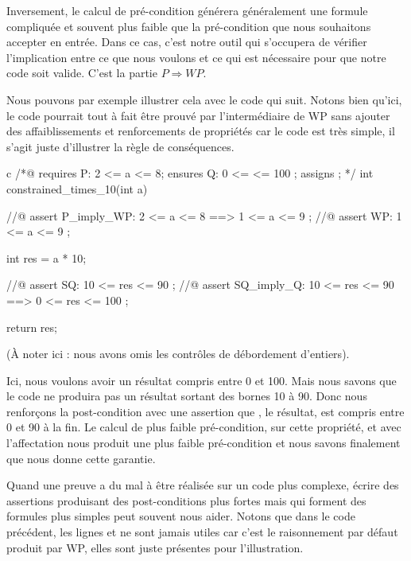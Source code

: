 Inversement, le calcul de pré-condition générera généralement une formule 
compliquée et souvent plus faible que la pré-condition que nous souhaitons
accepter en entrée. Dans ce cas, c'est notre outil qui s'occupera de vérifier 
l'implication entre ce que nous voulons et ce qui est nécessaire pour que notre
code soit valide. C'est la partie $P \Rightarrow WP$.



Nous pouvons par exemple illustrer cela avec le code qui suit. Notons bien qu'ici,
le code pourrait tout à fait être prouvé par l'intermédiaire de WP sans ajouter des
affaiblissements et renforcements de propriétés car le code est très simple, il 
s'agit juste d'illustrer la règle de conséquences.



\begin{CodeBlock}{c}
/*@
  requires P: 2 <= a <= 8;
  ensures  Q: 0 <= \result <= 100 ;
  assigns  \nothing ;
*/
int constrained_times_10(int a){
  //@ assert P_imply_WP: 2 <= a <= 8 ==> 1 <= a <= 9 ;
  //@ assert WP:         1 <= a <= 9 ;

  int res = a * 10;

  //@ assert SQ:         10 <= res <= 90 ;
  //@ assert SQ_imply_Q: 10 <= res <= 90 ==> 0 <= res <= 100 ;

  return res;
}
\end{CodeBlock}



(À noter ici : nous avons omis les contrôles de débordement d'entiers).



Ici, nous voulons avoir un résultat compris entre 0 et 100. Mais nous savons que
le code ne produira pas un résultat sortant des bornes 10 à 90. Donc nous 
renforçons la post-condition avec une assertion que , le résultat, est compris
entre 0 et 90 à la fin. Le calcul de plus faible pré-condition, sur cette propriété,
et avec l'affectation  nous produit une plus faible pré-condition 
 et nous savons finalement que  nous donne cette garantie.



Quand une preuve a du mal à être réalisée sur un code plus complexe, écrire des
assertions produisant des post-conditions plus fortes mais qui forment des formules
plus simples peut souvent nous aider. Notons que dans le code précédent, les lignes
 et  ne sont jamais utiles car c'est le raisonnement par
défaut produit par WP, elles sont juste présentes pour l'illustration.



